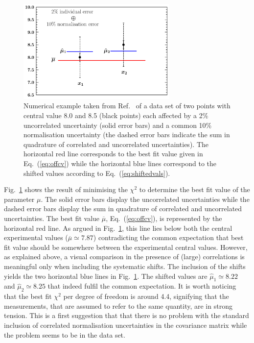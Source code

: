 \documentclass[10pt,a4paper]{article}
\begin{document}
\begin{figure}[h]
  \begin{centering}
    \includegraphics[width=0.7\textwidth]{plots/DAgostiniExample}
    \caption{Numerical example taken from
      Ref.~\cite{DAgostini:1993arp} of a data set of two points with
      central value 8.0 and 8.5 (black points) each affected by a 2\%
      uncorrelated uncertainty (solid error bars) and a common 10\%
      normalisation uncertainty (the dashed error bars indicate the
      sum in quadrature of correlated and uncorrelated
      uncertainties). The horizontal red line corresponds to the best
      fit value given in Eq.~(\ref{eq:offcv}) while the horizontal
      blue lines correspond to the shifted values according to
      Eq.~(\ref{eq:shiftedvals}).\label{fig:DAgostiniExample}}
  \end{centering}
\end{figure}
Fig.~\ref{fig:DAgostiniExample} shows the result of minimising the
$\chi^2$ to determine the best fit value of the parameter $\mu$. The
solid error bars display the uncorrelated uncertainties while the
dashed error bars display the sum in quadrature of correlated and
uncorrelated uncertainties. The best fit value $\overline{\mu}$,
Eq.~(\ref{eq:offcv}), is represented by the horizontal red line. As
argued in Fig.~\ref{fig:DAgostiniExample}, this line lies below both
the central experimental values ($\overline{\mu}\simeq 7.87$)
contradicting the common expectation that best fit value should be
somewhere between the experimental central values. However, as
explained above, a visual comparison in the presence of (large)
correlations is meaningful only when including the systematic
shifts. The inclusion of the shifts yields the two horizontal blue
lines in Fig.~\ref{fig:DAgostiniExample}. The shifted values are
$\hat{\mu}_1 \simeq 8.22$ and $\hat{\mu}_2 \simeq 8.25$ that indeed
fulfil the common expectation. It is worth noticing that the best fit
$\chi^2$ per degree of freedom is around 4.4, signifying that the
measurements, that are assumed to refer to the same quantity, are in
strong tension. This is a first suggestion that that there is no
problem with the standard inclusion of correlated normalisation
uncertainties in the covariance matrix while the problem seems to be
in the data set.
\end{document}
